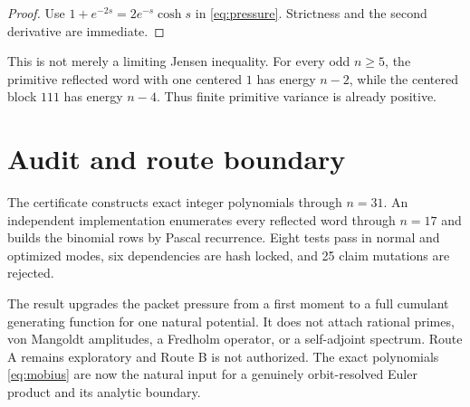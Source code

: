 \documentclass[11pt]{article}
\begin{document}
\begin{proof}
Use $1+e^{-2s}=2e^{-s}\cosh s$ in \eqref{eq:pressure}.  Strictness and the
second derivative are immediate.
\end{proof}

This is not merely a limiting Jensen inequality.  For every odd $n\ge5$,
the primitive reflected word with one centered $1$ has energy $n-2$, while
the centered block $111$ has energy $n-4$.  Thus finite primitive variance is
already positive.

\section{Audit and route boundary}

The certificate constructs exact integer polynomials through $n=31$.
An independent implementation enumerates every reflected word through
$n=17$ and builds the binomial rows by Pascal recurrence.  Eight tests pass
in normal and optimized modes, six dependencies are hash locked, and 25
claim mutations are rejected.

The result upgrades the packet pressure from a first moment to a full
cumulant generating function for one natural potential.  It does not attach
rational primes, von Mangoldt amplitudes, a Fredholm operator, or a
self-adjoint spectrum.  Route A remains exploratory and Route B is not
authorized.  The exact polynomials \eqref{eq:mobius} are now the natural
input for a genuinely orbit-resolved Euler product and its analytic boundary.



\end{document}

